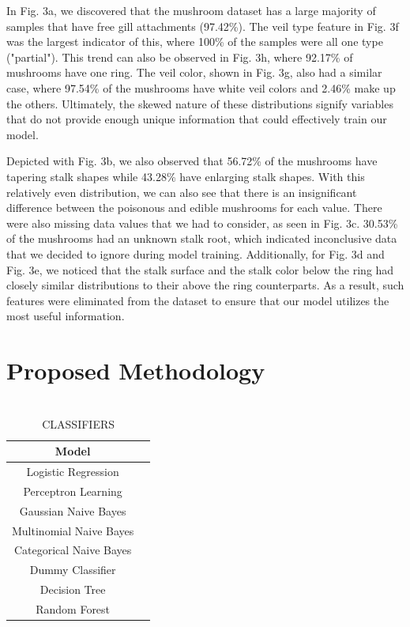 \documentclass[11pt, conference]{IEEEtran}
\begin{document}
    In Fig. 3a, we discovered that the mushroom dataset has a large majority of samples that have free gill attachments (97.42\%). The veil type feature in Fig. 3f was the largest indicator of this, where 100\% of the samples were all one type ("partial"). This trend can also be observed in Fig. 3h, where 92.17\% of mushrooms have one ring. The veil color, shown in Fig. 3g, also had a similar case, where 97.54\% of the mushrooms have white veil colors and 2.46\% make up the others. Ultimately, the skewed nature of these distributions signify variables that do not provide enough unique information that could effectively train our model.

    Depicted with Fig. 3b, we also observed that 56.72\% of the mushrooms have tapering stalk shapes while 43.28\% have enlarging stalk shapes. With this relatively even distribution, we can also see that there is an insignificant difference between the poisonous and edible mushrooms for each value. There were also missing data values that we had to consider, as seen in Fig. 3c. 30.53\% of the mushrooms had an unknown stalk root, which indicated inconclusive data that we decided to ignore during model training. Additionally, for Fig. 3d and Fig. 3e, we noticed that the stalk surface and the stalk color below the ring had closely similar distributions to their above the ring counterparts. As a result, such features were eliminated from the dataset to ensure that our model utilizes the most useful information.

\section{Proposed Methodology}
    \begin{table}[htbp]
        \centering  
        \caption{\\ CLASSIFIERS}
        \begin{tabular}{cc} \toprule
            \textbf{Model} \\
            \midrule
                Logistic Regression \\
            \midrule
                Perceptron Learning \\
            \midrule
                Gaussian Naive Bayes \\
            \midrule
                Multinomial Naive Bayes \\
            \midrule
                Categorical Naive Bayes \\
            \midrule
                Dummy Classifier \\
            \midrule
                Decision Tree \\
            \midrule
                Random Forest \\
            \bottomrule
        \end{tabular}
    \end{table}
\end{document}
